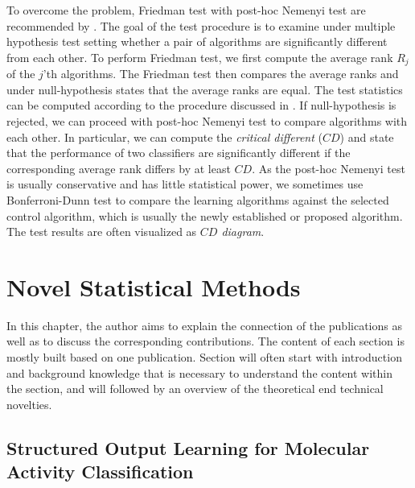 {%
To overcome the problem, Friedman test \citep{Friedman37the,Friedman40Comparison} with post-hoc Nemenyi test \citep{Nemenyi63distribution} are recommended by \citet{Demsar06statistical}.
The goal of the test procedure is to examine under multiple hypothesis test setting whether a pair of algorithms are significantly different from each other.
To perform Friedman test, we first compute the average rank $R_j$ of the $j$'th algorithms.
The Friedman test then compares the average ranks and under null-hypothesis states that the average ranks are equal.
The test statistics can be computed according to the procedure discussed in \citep{Demsar06statistical}.
If null-hypothesis is rejected, we can proceed with post-hoc Nemenyi test to compare algorithms with each other.
In particular, we can compute the \textit{critical different} ($CD$) and state that the performance of two classifiers are significantly different if the corresponding average rank differs by at least $CD$.
As the post-hoc Nemenyi test is usually conservative and has little statistical power, we sometimes use Bonferroni-Dunn test \citep{Dunn61mulitple} to compare the learning algorithms against the selected control algorithm, which is usually the newly established or proposed algorithm.
The test results are often visualized as \textit{$CD$ diagram}.















\chapter{Novel Statistical Methods}


In this chapter, the author aims to explain the connection of the publications as well as to discuss the corresponding contributions.
The content of each section is mostly built based on one publication.
Section will often start with introduction and background knowledge that is necessary to understand the content within the section, and will followed by an overview of the theoretical end technical novelties.

\section{Structured Output Learning for Molecular Activity Classification}

}
